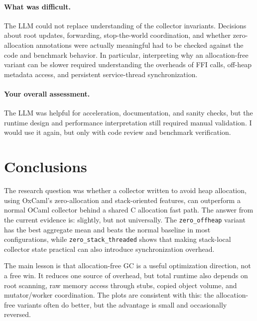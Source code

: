 \documentclass[11pt,a4paper]{article}
\begin{document}
\paragraph{What was difficult.}
The LLM could not replace understanding of the collector invariants. Decisions
about root updates, forwarding, stop-the-world coordination, and whether
zero-allocation annotations were actually meaningful had to be checked against
the code and benchmark behavior. In particular, interpreting why an
allocation-free variant can be slower required understanding the overheads of
FFI calls, off-heap metadata access, and persistent service-thread
synchronization.

\paragraph{Your overall assessment.}
The LLM was helpful for acceleration, documentation, and sanity checks, but the
runtime design and performance interpretation still required manual validation.
I would use it again, but only with code review and benchmark verification.

\section{Conclusions}
\label{sec:conclusions}

The research question was whether a collector written to avoid heap allocation,
using OxCaml's zero-allocation and stack-oriented features, can outperform a
normal OCaml collector behind a shared C allocation fast path. The answer from
the current evidence is: slightly, but not universally. The
\texttt{zero\_offheap} variant has the best aggregate mean and beats the normal
baseline in most configurations, while \texttt{zero\_stack\_threaded} shows
that making stack-local collector state practical can also introduce
synchronization overhead.

The main lesson is that allocation-free GC is a useful optimization direction,
not a free win. It reduces one source of overhead, but total runtime also
depends on root scanning, raw memory access through stubs, copied object volume,
and mutator/worker coordination. The plots are consistent with this: the
allocation-free variants often do better, but the advantage is small and
occasionally reversed.
\end{document}
